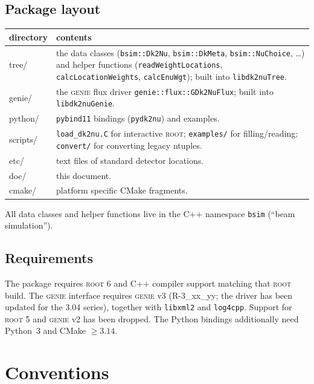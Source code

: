 \documentclass[11pt]{article}
\newcommand{\code}[1]{\texttt{#1}}
\newcommand{\genie}{\textsc{genie}\xspace}
\newcommand{\ROOT}{\textsc{root}\xspace}
\begin{document}
\subsection{Package layout}\label{sec:layout}

\begin{center}\small
\begin{tabularx}{\textwidth}{>{\ttfamily}l X}
\toprule
\textrm{\textbf{directory}} & \textbf{contents} \\ \midrule
tree/    & the data classes (\code{bsim::Dk2Nu}, \code{bsim::DkMeta},
           \code{bsim::NuChoice}, \ldots) and helper functions
           (\code{readWeightLocations}, \code{calcLocationWeights},
           \code{calcEnuWgt}); built into \code{libdk2nuTree}. \\
genie/   & the \genie flux driver \code{genie::flux::GDk2NuFlux}; built into
           \code{libdk2nuGenie}. \\
python/  & \code{pybind11} bindings (\code{pydk2nu}) and examples. \\
scripts/ & \code{load\_dk2nu.C} for interactive \ROOT; \code{examples/}
           for filling/reading; \code{convert/} for converting legacy
           ntuples. \\
etc/     & text files of standard detector locations. \\
doc/     & this document. \\
cmake/   & platform specific CMake fragments. \\
\bottomrule
\end{tabularx}
\end{center}

All data classes and helper functions live in the C++ namespace
\code{bsim} (``beam simulation'').

\subsection{Requirements}
The package requires \ROOT 6 and C++ compiler support matching that \ROOT
build.  The \genie interface requires \genie v3 (R-3\_xx\_yy; the driver has
been updated for the 3.04 series), together with \code{libxml2} and
\code{log4cpp}.  Support for \ROOT 5 and \genie v2 has been dropped.  The
Python bindings additionally need Python~3 and CMake $\geq 3.14$.

\section{Conventions}\label{sec:conventions}
\end{document}
